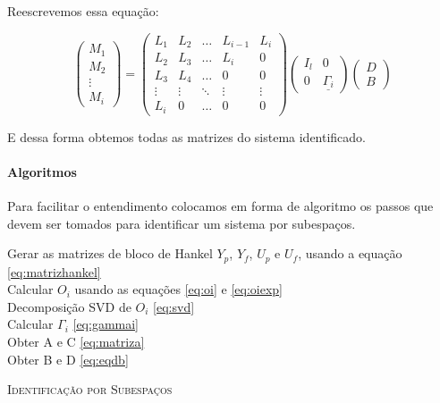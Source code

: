 Reescrevemos essa equação:

\begin{equation} \label{eq:eqdb}
\begin{pmatrix}
M_1\\M_2\\ \vdots \\ M_i
\end{pmatrix}
=
\begin{pmatrix}
L_1 &L_2& \dots & L_{i-1}& L_i\\
L_2& L_3 & \dots & L_i & 0\\
L_3 & L_4 & \dots & 0 & 0\\
\vdots & \vdots & \ddots & \vdots & \vdots\\
L_i & 0 & \dots & 0 &0
\end{pmatrix}
\begin{pmatrix}
I_l & 0 \\ 0 & \underline{\Gamma_i}
\end{pmatrix}
\begin{pmatrix}
D \\ B
\end{pmatrix}
\end{equation}

E dessa forma obtemos todas as matrizes do sistema identificado.

\paragraph{Algoritmos}\label{s:subalgoritmos}
Para facilitar o entendimento colocamos em forma de algoritmo os passos que devem ser tomados para identificar um sistema por subespaços.

\IncMargin{1em}
\begin{algorithm}[H]
	\nl Gerar as matrizes de bloco de Hankel $Y_p$, $Y_f$, $U_p$ e $U_f$, usando a equação \eqref{eq:matrizhankel}\\
	\nl Calcular $O_i$ usando as equações \eqref{eq:oi} e \eqref{eq:oiexp}\\
	\nl Decomposição SVD de $O_i$ \eqref{eq:svd}\\
	\nl Calcular $\Gamma_i$ \eqref{eq:gammai}\\
	\nl Obter A e C \eqref{eq:matriza}\\
	\nl Obter B e D \eqref{eq:eqdb}\\
	\label{alg:sub}
	\caption{\textsc{Identificação por Subespaços}}
	
\end{algorithm}
\DecMargin{1em}


